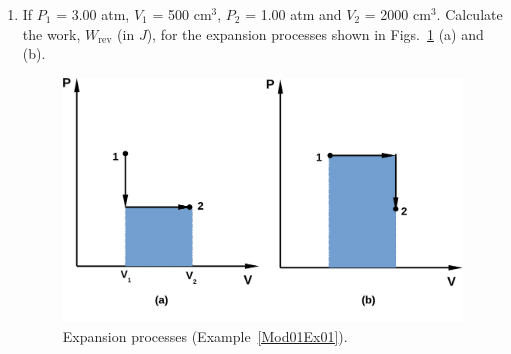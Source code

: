 \documentclass[12pts,a4paper,amsmath,amssymb,floatfix]{article}%
\begin{document}
\begin{enumerate}[1)]
   \item\label{Mod01Ex01} If $P_{1}$ = 3.00 atm, $V_{1}$ = 500 cm$^{3}$, $P_{2}$ = 1.00 atm and $V_{2}$ = 2000 cm$^{3}$. Calculate the work, $W_{\text{rev}}$ (in $J$), for the expansion processes shown in Figs.~\ref{Mod01Fig01} (a) and (b).
      \begin{figure}[h]
         \begin{center}
           \includegraphics[width=.6\columnwidth,clip]{./Figs/Mod1Ex1}
           \vspace{-.1cm}\caption{Expansion processes (Example~\ref{Mod01Ex01}).}\label{Mod01Fig01}
         \end{center}
       \end{figure}


\end{enumerate}
\end{document}
